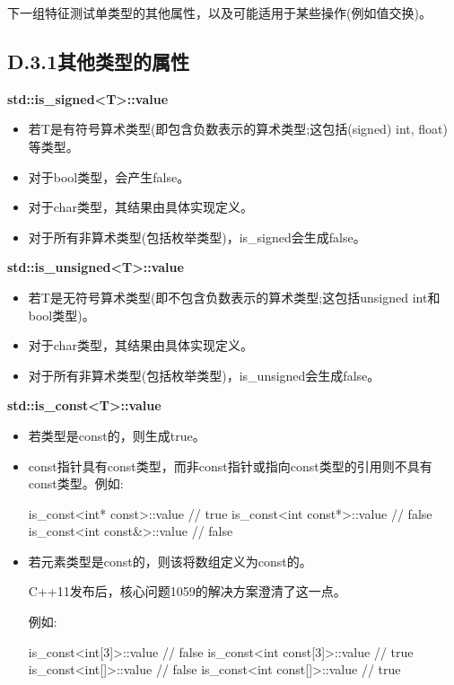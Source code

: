 
下一组特征测试单类型的其他属性，以及可能适用于某些操作(例如值交换)。

\subsection{D.3.1\hspace{0.2cm}其他类型的属性}

\textbf{std::is\_signed<T>::value}

\begin{itemize}
\item 
若T是有符号算术类型(即包含负数表示的算术类型;这包括(signed) int, float)等类型。

\item 
对于bool类型，会产生false。

\item 
对于char类型，其结果由具体实现定义。

\item 
对于所有非算术类型(包括枚举类型)，is\_signed会生成false。
\end{itemize}

\textbf{std::is\_unsigned<T>::value}

\begin{itemize}
\item 
若T是无符号算术类型(即不包含负数表示的算术类型;这包括unsigned int和bool类型)。

\item 
对于char类型，其结果由具体实现定义。

\item 
对于所有非算术类型(包括枚举类型)，is\_unsigned会生成false。
\end{itemize}

\textbf{std::is\_const<T>::value}

\begin{itemize}
\item 
若类型是const的，则生成true。

\item 
const指针具有const类型，而非const指针或指向const类型的引用则不具有const类型。例如:
\begin{cpp}
is_const<int* const>::value // true
is_const<int const*>::value // false
is_const<int const&>::value // false
\end{cpp}

\item 
若元素类型是const的，则该将数组定义为const的。

\begin{notice}C++11发布后，核心问题1059的解决方案澄清了这一点。
\end{notice}

例如:
\begin{cpp}
is_const<int[3]>::value // false
is_const<int const[3]>::value // true
is_const<int[]>::value // false
is_const<int const[]>::value // true
\end{cpp}

\end{itemize}

